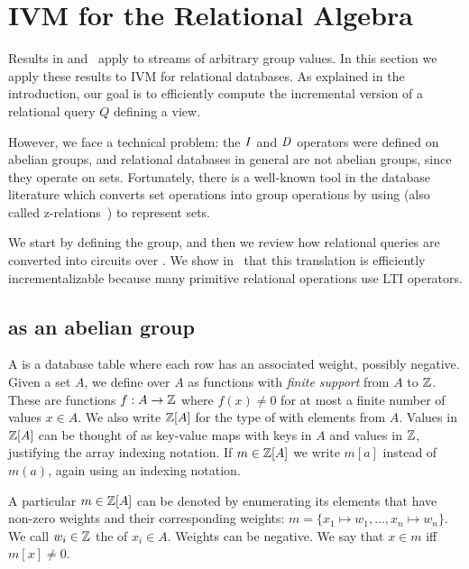\section{IVM for the Relational Algebra}\label{sec:relational}

Results in  and~
apply to streams of arbitrary group values.  In this
section we apply these results to
IVM for relational databases.  As explained in the introduction, our goal is to
efficiently compute the incremental version of a relational query $Q$
defining a view.

However, we face a technical problem: the $\mathit{I}$ and $\mathit{D}$ operators were
defined on abelian groups, and relational databases in general are
not abelian groups, since they operate on sets.  Fortunately,
there is a well-known tool in the database literature
which converts set operations into group operations by using \zrs
(also called z-relations~\cite{green-tcs11}) to represent sets.

We start by defining the \zrs group, and then we review how relational
queries are converted into \dbsp circuits over \zrs.  We show
in~ that this translation is
efficiently incrementalizable because many primitive relational
operations use LTI \zr operators.

\subsection{\zrs as an abelian group}

A \zr is a database table where each row has an associated weight,
possibly negative.  Given a set $A$, we define  over $A$
as functions with \emph{finite support} from $A$ to $\mathbb{Z}$.  These are
functions $f: A \rightarrow \mathbb{Z}$ where $f(x) \not= 0$ for at most a
finite number of values $x \in A$.  We also write $\mathbb{Z}[A]$ for the type
of \zrs with elements from $A$.  Values in $\mathbb{Z}[A]$ can be thought of
as key-value maps with keys in $A$ and values in $\mathbb{Z}$, justifying the
array indexing notation.  If $m \in \mathbb{Z}[A]$ we write $m[a]$ instead of
$m(a)$, again using an indexing notation.

A particular \zr $m \in \mathbb{Z}[A]$ can be denoted by enumerating its
elements that have non-zero weights and their corresponding weights:
$m = \{ x_1 \mapsto w_1, \dots, x_n \mapsto w_n \}$.
We call $w_i \in \mathbb{Z}$ the 
of $x_i \in A$.  Weights can be negative.
We say that $x \in m$ iff $m[x] \not= 0$.

